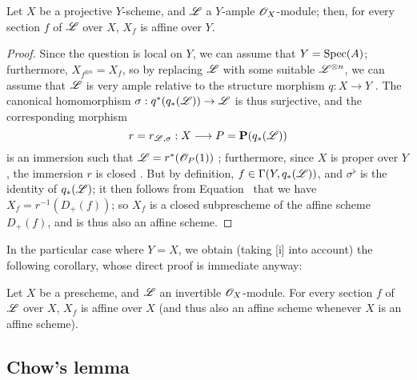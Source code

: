 \begin{proposition}[5.5.7]
\label{II.5.5.7}
Let $X$ be a projective $Y$-scheme, and $\mathscr{L}$ a $Y$-ample $\mathscr{O}_X$-module; then, for every section $f$ of $\mathscr{L}$ over $X$, $X_f$ is affine over $Y$.
\end{proposition}

\begin{proof}
\label{proof-II.5.5.6}
Since the question is local on $Y$, we can assume that $Y=\operatorname{Spec}(A)$; furthermore, $X_{f^{\otimes n}}=X_f$, so by replacing $\mathscr{L}$ with some suitable $\mathscr{L}^{\otimes n}$, we can assume that $\mathscr{L}$ is very ample relative to the structure morphism $q:X\to Y$ .
The canonical homomorphism $\sigma:q^*(q_*(\sh{L}))\to\sh{L}$ is thus surjective, and the corresponding morphism
\[
  r=r_{\sh{L},\sigma}:X\to P=\bb{P}(q_*(\sh{L}))
\]
is an immersion such that $\mathscr{L}=r^*(\mathscr{O}_P(1))$ ; furthermore, since $X$ is proper over $Y$, the immersion $r$ is closed .
But by definition, $f\in\Gamma(Y,q_*(\mathscr{L}))$, and $\sigma^\flat$ is the identity of $q_*(\mathscr{L})$; it then follows from Equation~ that we have $X_f=r^{-1}(D_+(f))$;
so $X_f$ is a closed subprescheme of the affine scheme $D_+(f)$, and is thus also an affine scheme.
\end{proof}

In the particular case where $Y=X$, we obtain (taking [i] into account) the following corollary, whose direct proof is immediate anyway:
\begin{corollary}[5.5.8]
\label{II.5.5.8}
Let $X$ be a prescheme, and $\mathscr{L}$ an invertible $\mathscr{O}_X$-module.
For every section $f$ of $\mathscr{L}$ over $X$, $X_f$ is affine over $X$ (and thus also an affine scheme whenever $X$ is an affine scheme).
\end{corollary}

\subsection{Chow's lemma}
\label{subsection:II.5.6}

